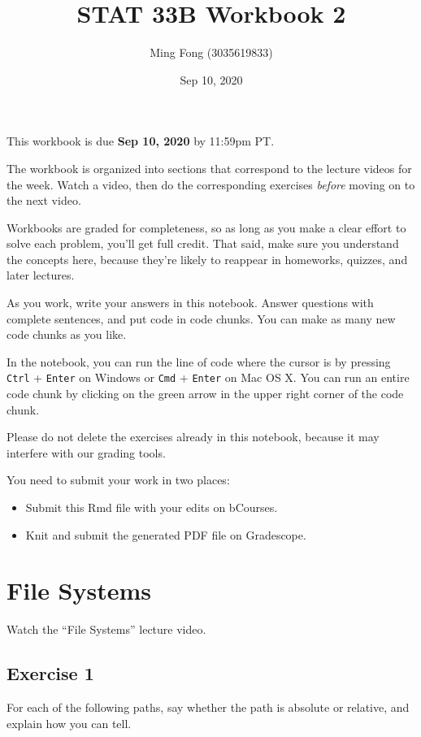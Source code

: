 \documentclass[
]{article}
\title{STAT 33B Workbook 2}
\author{Ming Fong (3035619833)}
\date{Sep 10, 2020}
\providecommand{\tightlist}{%
  \setlength{\itemsep}{0pt}\setlength{\parskip}{0pt}}
\begin{document}
\maketitle

This workbook is due \textbf{Sep 10, 2020} by 11:59pm PT.

The workbook is organized into sections that correspond to the lecture
videos for the week. Watch a video, then do the corresponding exercises
\emph{before} moving on to the next video.

Workbooks are graded for completeness, so as long as you make a clear
effort to solve each problem, you'll get full credit. That said, make
sure you understand the concepts here, because they're likely to
reappear in homeworks, quizzes, and later lectures.

As you work, write your answers in this notebook. Answer questions with
complete sentences, and put code in code chunks. You can make as many
new code chunks as you like.

In the notebook, you can run the line of code where the cursor is by
pressing \texttt{Ctrl} + \texttt{Enter} on Windows or \texttt{Cmd} +
\texttt{Enter} on Mac OS X. You can run an entire code chunk by clicking
on the green arrow in the upper right corner of the code chunk.

Please do not delete the exercises already in this notebook, because it
may interfere with our grading tools.

You need to submit your work in two places:

\begin{itemize}
\tightlist
\item
  Submit this Rmd file with your edits on bCourses.
\item
  Knit and submit the generated PDF file on Gradescope.
\end{itemize}

\hypertarget{file-systems}{%
\section{File Systems}\label{file-systems}}

Watch the ``File Systems'' lecture video.

\hypertarget{exercise-1}{%
\subsection{Exercise 1}\label{exercise-1}}

For each of the following paths, say whether the path is absolute or
relative, and explain how you can tell.
\end{document}
